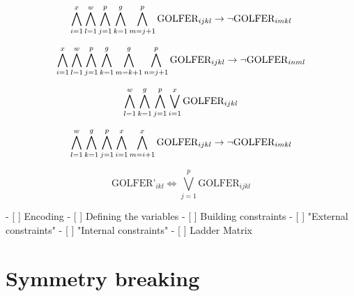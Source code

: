 \documentclass[a4paper]{scrartcl}
\begin{document}
\begin{equation}
\centering
    \bigwedge \limits_{i=1}^x 
    \bigwedge \limits_{l=1}^w 
    \bigwedge \limits_{j=1}^p
    \bigwedge \limits_{k=1}^g 
    \bigwedge \limits_{m=j+1}^p 
    \text{GOLFER}_{ijkl} 
    \to
    \neg \text{GOLFER}_{imkl}
\end{equation}

\begin{equation}
\centering
    \bigwedge \limits_{i=1}^x 
    \bigwedge \limits_{l=1}^w 
    \bigwedge \limits_{j=1}^p
    \bigwedge \limits_{k=1}^g 
    \bigwedge \limits_{m=k+1}^g 
    \bigwedge \limits_{n=j+1}^p 
    \text{GOLFER}_{ijkl} 
    \to
    \neg \text{GOLFER}_{inml}
\end{equation}

\begin{equation}
\centering
    \bigwedge \limits_{l=1}^w 
    \bigwedge \limits_{k=1}^g 
    \bigwedge \limits_{j=1}^p
    \bigvee \limits_{i=1}^x 
    \text{GOLFER}_{ijkl}
\end{equation}

\begin{equation}
\centering
    \bigwedge \limits_{l=1}^w 
    \bigwedge \limits_{k=1}^g 
    \bigwedge \limits_{j=1}^p
    \bigwedge \limits_{i=1}^x 
    \bigwedge \limits_{m=i+1}^x 
    \text{GOLFER}_{ijkl} 
    \to
    \neg \text{GOLFER}_{imkl}
\end{equation}


\begin{equation}
    \text{GOLFER'}_{ikl} \iff \bigvee \limits_{j=1}^p \text{GOLFER}_{ijkl}
\end{equation}


- [ ] Encoding
    - [ ] Defining the variables
    - [ ] Building constraints
        - [ ] "External constraints"
        - [ ] "Internal constraints"
            - [ ] Ladder Matrix

\section{Symmetry breaking}
\end{document}

